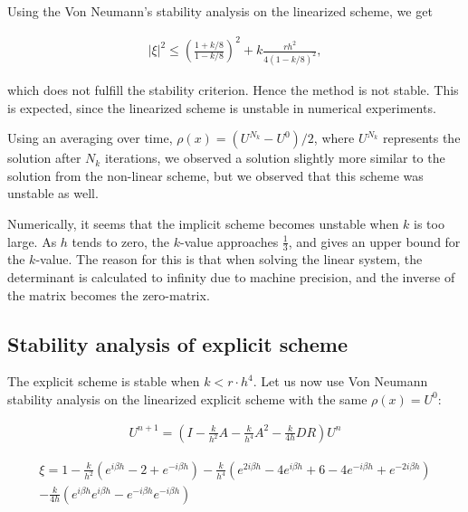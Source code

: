 


Using the Von Neumann's stability analysis on the linearized scheme, we get 

\begin{align*}
|\xi |^2 \le \left(\frac{1+k/8}{1-k/8}\right)^2 + k\frac{rh^2}{4(1-k/8)^2},
\end{align*}

which does not fulfill the stability criterion. Hence the method is not stable. This is expected, since the linearized scheme is unstable in numerical experiments. 

Using an averaging over time, $\rho(x) = (U^{N_k}-U^0)/2$, where $U^{N_k}$ represents the solution after $N_k$ iterations, we observed a solution slightly more similar to the solution from the non-linear scheme, but we  observed that this scheme was unstable as well.
 
Numerically, it seems that the implicit scheme becomes unstable when $k$ is too large. As $h$ tends to zero, the $k$-value approaches $\frac{1}{3}$, and gives an upper bound for the $k$-value. The reason for this is that when solving the linear system, the determinant is calculated to infinity due to machine precision, and the inverse of the matrix becomes the zero-matrix. 


\subsection{Stability analysis of explicit scheme}

The explicit scheme is stable when $k < r \cdot h^4$. Let us now use Von Neumann stability analysis on the linearized explicit scheme with the same $\rho(x) = U^0$:


\begin{align*}
U^{n+1} = \left(I - \frac{k}{h^2}A - \frac{k}{h^4}A^2 - \frac{k}{4h} DR\right)U^{n} 
\end{align*}


\begin{align*}
\xi = 1 - \frac{k}{h^2}(e^{i\beta h}-2+e^{-i\beta h}) - \frac{k}{h^4}(e^{2i\beta h}-4e^{i\beta h}+6-4e^{-i\beta h}+e^{-2i\beta h}) \\
 - \frac{k}{4h}(e^{i\beta h}e^{i\beta h} - e^{-i\beta h}e^{-i\beta h})\\
\end{align*}

